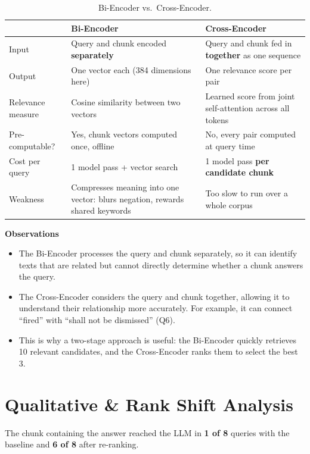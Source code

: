 \documentclass[11pt,a4paper]{article}
\newenvironment{observations}
  {\par\smallskip\noindent\textbf{Observations}\begin{itemize}}
  {\end{itemize}\smallskip}
\begin{document}
\begin{table}[H]
\centering\small
\begin{tabularx}{\linewidth}{l L L}
\toprule
 & \textbf{Bi-Encoder} & \textbf{Cross-Encoder} \\
\midrule
Input & Query and chunk encoded \textbf{separately} & Query and chunk fed in \textbf{together} as one sequence \\
Output & One vector each (384 dimensions here) & One relevance score per pair \\
Relevance measure & Cosine similarity between two vectors & Learned score from joint self-attention across all tokens \\
Pre-computable? & Yes, chunk vectors computed once, offline & No, every pair computed at query time \\
Cost per query & 1 model pass + vector search & 1 model pass \textbf{per candidate chunk} \\
Weakness & Compresses meaning into one vector: blurs negation, rewards shared keywords & Too slow to run over a whole corpus \\
\bottomrule
\end{tabularx}
\caption{Bi-Encoder vs.\ Cross-Encoder.}
\end{table}

\begin{observations}
      \item The Bi-Encoder processes the query and chunk separately, so it can identify texts that are related but cannot directly determine whether a chunk answers the query.
      \item The Cross-Encoder considers the query and chunk together, allowing it to understand their relationship more accurately. For example, it can connect ``fired'' with ``shall not be dismissed'' (Q6).
      \item This is why a two-stage approach is useful: the Bi-Encoder quickly retrieves 10 relevant candidates, and the Cross-Encoder ranks them to select the best 3.
\end{observations}

\section{Qualitative \& Rank Shift Analysis}

The chunk containing the answer reached the LLM in \textbf{1 of 8} queries with the baseline and
\textbf{6 of 8} after re-ranking.
\end{document}
